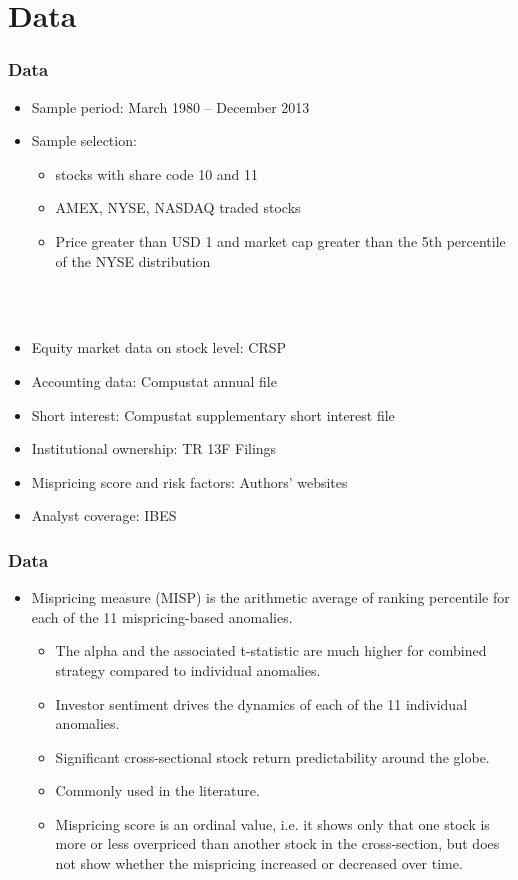 \documentclass{beamer}
\begin{document}
\section{Data}
\begin{frame}
	\frametitle{Data}
\begin{itemize}
\item Sample period: March 1980 -- December 2013
\item Sample selection:
\begin{itemize}
\item stocks with share code 10 and 11
\item AMEX, NYSE, NASDAQ traded stocks
\item Price greater than USD 1 and market cap greater than the 5th percentile of the NYSE distribution
\end{itemize}
\ \\
\ \\
\item Equity market data on stock level: CRSP
\item Accounting data: Compustat annual file
\item Short interest: Compustat supplementary short interest file
\item Institutional ownership: TR 13F Filings
\item Mispricing score and risk factors: Authors' websites
\item Analyst coverage: IBES
\end{itemize}
\end{frame}
\begin{frame}
	\frametitle{Data}

	\begin{itemize}
		\item Mispricing measure (MISP) is the arithmetic average of ranking percentile for each of the 11 mispricing-based anomalies. \citep{Stambaugh2015}
		\begin{itemize}
			\item The alpha and the associated t-statistic are much higher for combined strategy compared to individual anomalies.
			\item Investor sentiment drives the dynamics of each of the 11 individual anomalies. \citep{Stambaugh2012a}
			\item Significant cross-sectional stock return predictability around the globe. \citep{Jacobs2016}
			\item Commonly used in the literature.
			\item Mispricing score is an ordinal value, i.e. it shows only that one stock is more or less overpriced than another stock in the cross-section, but does not show whether the mispricing increased or decreased over time. 
		\end{itemize}	
	\end{itemize}
\end{frame}  
\end{document}
